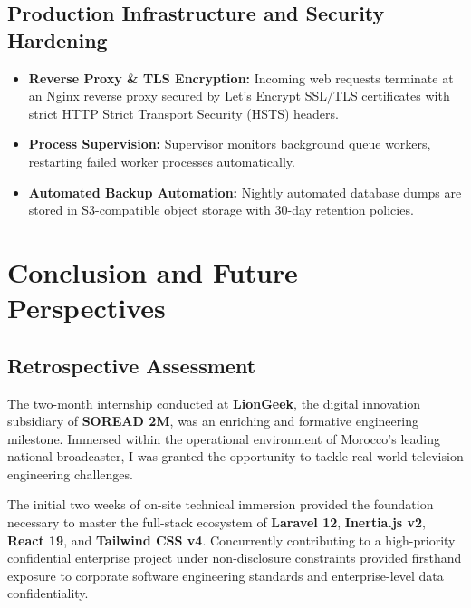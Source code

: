 \documentclass[12pt,a4paper,oneside]{report}
\begin{document}
\section{Production Infrastructure and Security Hardening}
\begin{itemize}
    \item \textbf{Reverse Proxy \& TLS Encryption:} Incoming web requests terminate at an Nginx reverse proxy secured by Let's Encrypt SSL/TLS certificates with strict HTTP Strict Transport Security (HSTS) headers.
    \item \textbf{Process Supervision:} Supervisor monitors background queue workers, restarting failed worker processes automatically.
    \item \textbf{Automated Backup Automation:} Nightly automated database dumps are stored in S3-compatible object storage with 30-day retention policies.
\end{itemize}

\newpage

\chapter*{Conclusion and Future Perspectives}

\section*{Retrospective Assessment}
The two-month internship conducted at \textbf{LionGeek}, the digital innovation subsidiary of \textbf{SOREAD 2M}, was an enriching and formative engineering milestone. Immersed within the operational environment of Morocco's leading national broadcaster, I was granted the opportunity to tackle real-world television engineering challenges.

The initial two weeks of on-site technical immersion provided the foundation necessary to master the full-stack ecosystem of \textbf{Laravel 12}, \textbf{Inertia.js v2}, \textbf{React 19}, and \textbf{Tailwind CSS v4}. Concurrently contributing to a high-priority confidential enterprise project under non-disclosure constraints provided firsthand exposure to corporate software engineering standards and enterprise-level data confidentiality.
\end{document}
